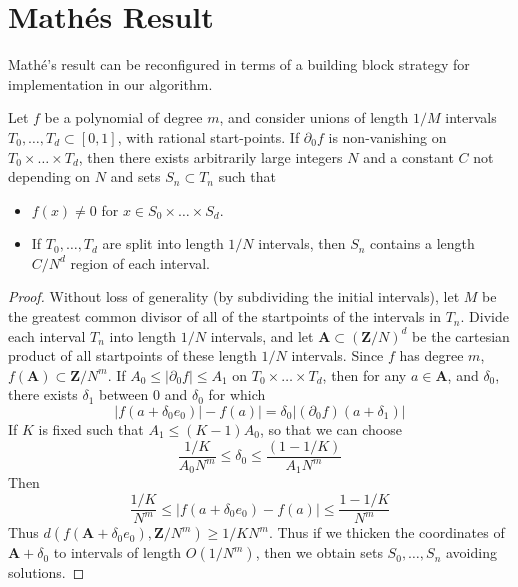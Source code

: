 \section{Math\'{e}s Result}

Math\'{e}'s result can be reconfigured in terms of a building block strategy for implementation in our algorithm.

\begin{theorem}
    Let $f$ be a polynomial of degree $m$, and consider unions of length $1/M$ intervals $T_0, \dots, T_d \subset [0,1]$, with rational start-points. If $\partial_0 f$ is non-vanishing on $T_0 \times \dots \times T_d$, then there exists arbitrarily large integers $N$ and a constant $C$ not depending on $N$ and sets $S_n \subset T_n$ such that
    \begin{itemize}
        \item $f(x) \neq 0$ for $x \in S_0 \times \dots \times S_d$.
        \item If $T_0, \dots, T_d$ are split into length $1/N$ intervals, then $S_n$ contains a length $C/N^d$ region of each interval.
    \end{itemize}
\end{theorem}
\begin{proof}
    Without loss of generality (by subdividing the initial intervals), let $M$ be the greatest common divisor of all of the startpoints of the intervals in $T_n$. Divide each interval $T_n$ into length $1/N$ intervals, and let $\mathbf{A} \subset (\mathbf{Z}/N)^d$ be the cartesian product of all startpoints of these length $1/N$ intervals. Since $f$ has degree $m$, $f(\mathbf{A}) \subset \mathbf{Z}/N^m$. If $A_0 \leq |\partial_0 f| \leq A_1$ on $T_0 \times \dots \times T_d$, then for any $a \in \mathbf{A}$, and $\delta_0$, there exists $\delta_1$ between $0$ and $\delta_0$ for which
    \[ |f(a + \delta_0 e_0)| - f(a)| = \delta_0 |(\partial_0 f)(a + \delta_1)| \]
    If $K$ is fixed such that $A_1 \leq (K-1)A_0$, so that we can choose
    \[ \frac{1/K}{A_0N^m} \leq \delta_0 \leq \frac{\left( 1 - 1/K \right)}{A_1N^m} \]
    Then
    \[ \frac{1/K}{N^m} \leq |f(a + \delta_0 e_0) - f(a)| \leq \frac{1 - 1/K}{N^m} \]
    Thus $d(f(\mathbf{A} + \delta_0 e_0), \mathbf{Z}/N^m) \geq 1/KN^m$. Thus if we thicken the coordinates of $\mathbf{A} + \delta_0$ to intervals of length $O(1/N^m)$, then we obtain sets $S_0, \dots, S_n$ avoiding solutions.
\end{proof}

\endinput